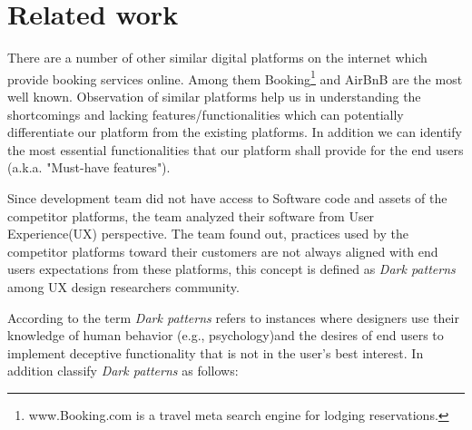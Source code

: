 \chapter{Related work}
\label{chapter3}
\thispagestyle{plain}
There are a number of other similar digital platforms on the internet which provide booking services online. Among them Booking\footnote{www.Booking.com is a travel meta search engine for lodging reservations.} and AirBnB are the most well known. Observation of similar platforms help us in understanding the shortcomings and lacking features/functionalities which can potentially differentiate our platform from the existing platforms. In addition we can identify the most essential functionalities that our platform shall provide for the end users (a.k.a. "Must-have features"). 

Since development team did not have access to Software code and assets of the competitor platforms, the team analyzed their software from User Experience(UX) perspective. The team found out, practices used by the competitor platforms toward their customers are not always aligned with end users expectations from these platforms, this concept is  defined as \textit{Dark patterns} among UX design researchers community.

According to \citeauthor{dark_pattern} the term \textit{Dark patterns} refers to instances where designers use their knowledge of human behavior (e.g., psychology)and the desires of end users to implement deceptive functionality that is not in the user’s best interest\cite{dark_pattern}. In addition \citeauthor{dark_pattern} classify \textit{Dark patterns} as follows:

